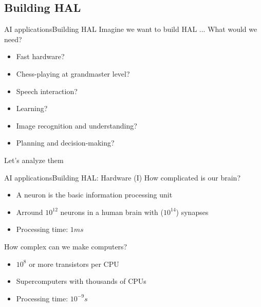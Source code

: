 \documentclass[10pt,compress]{beamer} %
\begin{document}
\subsection{Building HAL}
\begin{frame}{AI applications}{Building HAL}
	Imagine we want to build HAL ... What would we need?
	\begin{itemize}
		\item Fast hardware?
		\item Chess-playing at grandmaster level?
		\item Speech interaction?
		\item Learning?
		\item Image recognition and understanding?
		\item Planning and decision-making?
	\end{itemize}
	Let's analyze them
\end{frame}

\begin{frame}{AI applications}{Building HAL: Hardware (I)}
	How complicated is our brain?
	\begin{itemize}
		\item A neuron is the basic information processing unit
		\item Arround $10^{12}$ neurons in a human brain with ($10^{14}$) synapses 
		\item Processing time: $1 ms$
	\end{itemize}
	How complex can we make computers?
	\begin{itemize}
		\item $10^8$ or more transistors per CPU
		\item Supercomputers with thousands of CPUs
		\item Processing time: $10^{-9}s$
	\end{itemize}
\end{frame}
\end{document}
